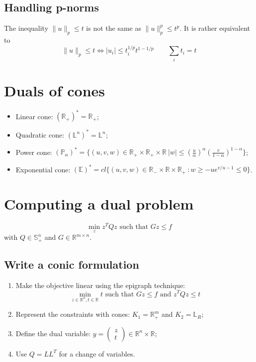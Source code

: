 \documentclass[12pt, openany]{report}
\newcommand{\R}{\mathbb{R}}
\theoremstyle{definition}
\begin{document}
\subsection{Handling p-norms}
The inequality $\lVert u\rVert_p \le t$ is not the same as $\lVert u\rVert_p^p \le t^p$. It is rather equivalent to 
\begin{equation}
    \lVert u\rVert_p \le t \Longleftrightarrow |u_i| \le t_i^{1/p}t^{1-1/p} \qquad \sum_i t_i = t
\end{equation}
\section{Duals of cones}
\begin{itemize}
    \item Linear cone: $(\R_+)^* = \R_+$;
    \item Quadratic cone: $(\mathbb{L}^n)^* = \mathbb{L}^n$;
    \item Power cone: $(\mathbb{P}_\alpha)^* = \{(u,v,w)\in \R_+\times \R_+\times \R \: |w| \le \left(\frac{u}{\alpha}\right)^\alpha \left(\frac{v}{1-\alpha}\right)^{1-\alpha}\}$;
    \item Exponential cone: $(\mathbb{E})^* = cl\{(u,v,w)\in \R_- \times \R\times \R_+\: : w\ge -ue^{v/u-1}\le 0\}$.
\end{itemize}
\section{Computing a dual problem}
\begin{equation}
    \min_z z^TQz \text{ such that }Gz\le f 
\end{equation}
with $Q\in \mathbb{S}_+^n$ and $G\in \R^{m\times n}$.
\subsection{Write a conic formulation}
\begin{enumerate}
    \item Make the objective linear using the epigraph technique:
    \begin{equation}
        \min_{z\in \R^n,t\in \R} t \text{ such that }Gz\le f\text{ and } z^TQz\le t
    \end{equation}
    \item Represent the constraints with cones: $K_1 =\R^m_+$ and $K_2 = \mathbb{L}_R$;
    \item Define the dual variable: $y=\begin{pmatrix}
        z\\t
    \end{pmatrix} \in \R^n\times \R$;
    \item Use $Q=LL^T$ for a change of variables. 
\end{enumerate}
\end{document}
